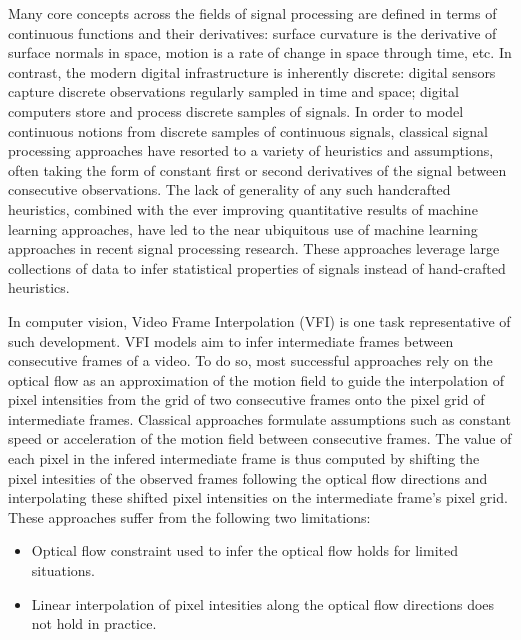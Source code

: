 \documentclass{article}
\begin{document}
Many core concepts across the fields of signal processing are defined in terms of continuous functions and their derivatives:
surface curvature is the derivative of surface normals in space,
motion is a rate of change in space through time, etc.
In contrast, the modern digital infrastructure is inherently discrete:
digital sensors capture discrete observations regularly sampled in time and space;
digital computers store and process discrete samples of signals.
In order to model continuous notions from discrete samples of continuous signals,
classical signal processing approaches have resorted to a variety of heuristics and assumptions,
often taking the form of constant first or second derivatives of the signal between consecutive observations.
The lack of generality of any such handcrafted heuristics,
combined with the ever improving quantitative results of machine learning approaches,
have led to the near ubiquitous use of machine learning approaches in recent signal processing research.
These approaches leverage large collections of data to infer statistical properties of signals instead of hand-crafted heuristics.

In computer vision, Video Frame Interpolation (VFI) is one task representative of such development.
VFI models aim to infer intermediate frames between consecutive frames of a video.
To do so, most successful approaches rely on the optical flow as an approximation of the motion field
to guide the interpolation of pixel intensities from the grid of two consecutive frames onto the pixel grid of intermediate frames.
Classical approaches formulate assumptions such as constant speed or acceleration of the motion field between consecutive frames.
The value of each pixel in the infered intermediate frame is thus computed by shifting the pixel intesities of the observed frames following the 
optical flow directions and interpolating these shifted pixel intensities on the intermediate frame's pixel grid.
These approaches suffer from the following two limitations:

\begin{itemize}
\item Optical flow constraint used to infer the optical flow holds for limited situations. %
\item Linear interpolation of pixel intesities along the optical flow directions does not hold in practice. %
\end{itemize}
\end{document}
